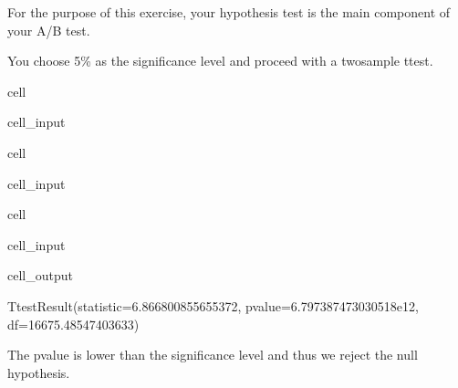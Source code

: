 \documentclass[letterpaper,10pt,english]{sphinxmanual}
\begin{document}
\sphinxAtStartPar
{} For the purpose of this exercise, your hypothesis test is the main component of your A/B test.

\sphinxAtStartPar
You choose 5\% as the significance level and proceed with a two\sphinxhyphen{}sample t\sphinxhyphen{}test.

\begin{sphinxuseclass}{cell}
\begin{sphinxuseclass}{cell_input}
\begin{sphinxVerbatim}[commandchars=\\\{\}]
  \PYG{p}{[}\PYG{p}{[}\PYG{p}{]}  \PYG{p}{]}
\end{sphinxVerbatim}

\end{sphinxuseclass}
\end{sphinxuseclass}
\begin{sphinxuseclass}{cell}
\begin{sphinxuseclass}{cell_input}
\begin{sphinxVerbatim}[commandchars=\\\{\}]
  \PYG{p}{[}\PYG{p}{[}\PYG{p}{]}  \PYG{p}{]}
\end{sphinxVerbatim}

\end{sphinxuseclass}
\end{sphinxuseclass}
\begin{sphinxuseclass}{cell}
\begin{sphinxuseclass}{cell_input}
\begin{sphinxVerbatim}[commandchars=\\\{\}]
\PYG{p}{[}\PYG{p}{]} \PYG{p}{[}\PYG{p}{]} 
\end{sphinxVerbatim}

\end{sphinxuseclass}
\begin{sphinxuseclass}{cell_output}
\begin{sphinxVerbatim}[commandchars=\\\{\}]
TtestResult(statistic=6.866800855655372, pvalue=6.797387473030518e\PYGZhy{}12, df=16675.48547403633)
\end{sphinxVerbatim}

\end{sphinxuseclass}
\end{sphinxuseclass}
\sphinxAtStartPar
The p\sphinxhyphen{}value is lower than the significance level and thus we reject the null hypothesis.
\end{document}
